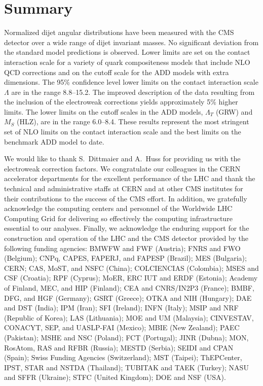 \documentclass[11pt,twoside,a4paper,cmspaper,final,collab]{cms-tdr}
\begin{document}
\section{Summary}

Normalized dijet angular distributions have been measured
with the CMS detector over a wide range of dijet invariant masses.
No significant deviation from the standard model predictions is observed.
Lower limits are set on the contact interaction scale
for a variety of quark compositeness models that include NLO
QCD corrections and on the cutoff scale for the ADD models with extra dimensions.
The 95\% confidence level lower limits on the contact interaction scale
$\Lambda$ are in the range 8.8--15.2\TeV. The improved
description of the data resulting from the inclusion of the electroweak
corrections yields approximately 5\% higher limits.
The lower limits on the cutoff scales in the ADD models, $\Lambda_{T}$ (GRW) and $M_{S}$
(HLZ), are in the range 6.0--8.4\TeV. These results represent the
most stringent set of NLO limits on the contact interaction scale
and the best limits on the benchmark ADD model to date.

\begin{acknowledgments}
We would like to thank S.~Dittmaier and A.~Huss for providing us with
the electroweak correction factors. We congratulate our colleagues in the CERN accelerator departments for the excellent performance of the LHC and thank the technical and administrative staffs at CERN and at other CMS institutes for their contributions to the success of the CMS effort. In addition, we gratefully acknowledge the computing centers and personnel of the Worldwide LHC Computing Grid for delivering so effectively the computing infrastructure essential to our analyses. Finally, we acknowledge the enduring support for the construction and operation of the LHC and the CMS detector provided by the following funding agencies: BMWFW and FWF (Austria); FNRS and FWO (Belgium); CNPq, CAPES, FAPERJ, and FAPESP (Brazil); MES (Bulgaria); CERN; CAS, MoST, and NSFC (China); COLCIENCIAS (Colombia); MSES and CSF (Croatia); RPF (Cyprus); MoER, ERC IUT and ERDF (Estonia); Academy of Finland, MEC, and HIP (Finland); CEA and CNRS/IN2P3 (France); BMBF, DFG, and HGF (Germany); GSRT (Greece); OTKA and NIH (Hungary); DAE and DST (India); IPM (Iran); SFI (Ireland); INFN (Italy); MSIP and NRF (Republic of Korea); LAS (Lithuania); MOE and UM (Malaysia); CINVESTAV, CONACYT, SEP, and UASLP-FAI (Mexico); MBIE (New Zealand); PAEC (Pakistan); MSHE and NSC (Poland); FCT (Portugal); JINR (Dubna); MON, RosAtom, RAS and RFBR (Russia); MESTD (Serbia); SEIDI and CPAN (Spain); Swiss Funding Agencies (Switzerland); MST (Taipei); ThEPCenter, IPST, STAR and NSTDA (Thailand); TUBITAK and TAEK (Turkey); NASU and SFFR (Ukraine); STFC (United Kingdom); DOE and NSF (USA).
\end{acknowledgments}
\end{document}
